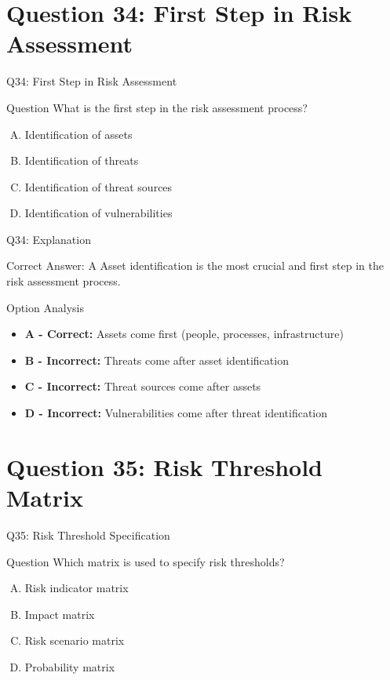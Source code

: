 \documentclass{beamer}
\begin{document}
	\section{Question 34: First Step in Risk Assessment}
	
	\begin{frame}{Q34: First Step in Risk Assessment}
		\begin{block}{Question}
			What is the first step in the risk assessment process?
		\end{block}
		\begin{enumerate}[(A)]
			\item Identification of assets
			\item Identification of threats
			\item Identification of threat sources
			\item Identification of vulnerabilities
		\end{enumerate}
	\end{frame}
	
	\begin{frame}{Q34: Explanation}
		\begin{block}{Correct Answer: A}
			Asset identification is the most crucial and first step in the risk assessment process.
		\end{block}
		\begin{block}{Option Analysis}
			\begin{itemize}
				\item \textbf{A - Correct:} Assets come first (people, processes, infrastructure)
				\item \textbf{B - Incorrect:} Threats come after asset identification
				\item \textbf{C - Incorrect:} Threat sources come after assets
				\item \textbf{D - Incorrect:} Vulnerabilities come after threat identification
			\end{itemize}
		\end{block}
	\end{frame}
	
	\section{Question 35: Risk Threshold Matrix}
	
	\begin{frame}{Q35: Risk Threshold Specification}
		\begin{block}{Question}
			Which matrix is used to specify risk thresholds?
		\end{block}
		\begin{enumerate}[(A)]
			\item Risk indicator matrix
			\item Impact matrix
			\item Risk scenario matrix
			\item Probability matrix
		\end{enumerate}
	\end{frame}
	
\end{document}

